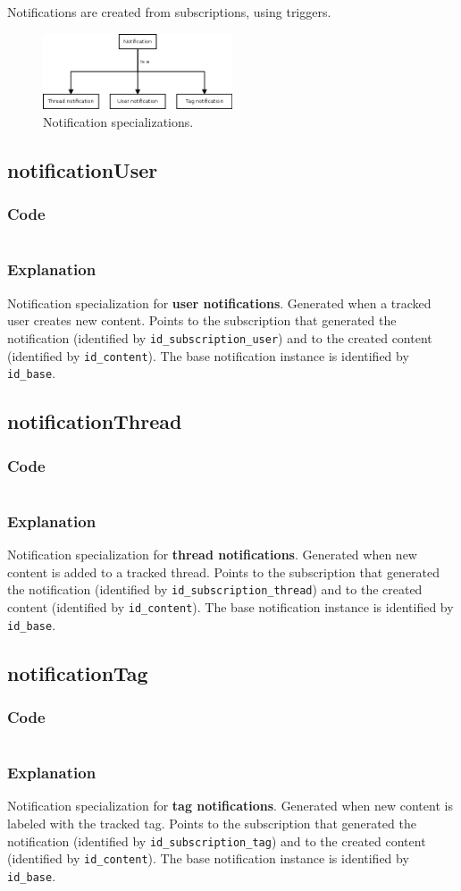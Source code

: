 \documentclass[12pt]{report}
\renewcommand\emph{\textbf}
\newcommand{\printSQLtest}[1]
{
    \inputminted[linenos, breaklines, breakbytoken, tabsize=4, fontsize=\footnotesize]{mysql}{#1}
}
\newcommand{\printSQLTablepage}[2]
{    
    \subsection{#2}
    \subsubsection{Code}
    \printSQLtest{../sql/parts/#1}
    \subsubsection{Explanation}
}
\begin{document}
                    Notifications are created from subscriptions, using triggers.

                    \begin{figure}[!htb]
                    \caption{Notification specializations.}
                    \centering
                    \includegraphics[width=0.5\textwidth]{td/15notificationbase}
                    \end{figure}

                \newpage

                \printSQLTablepage{16_tblNotificationUser.sql}{notificationUser}
                    Notification specialization for \emph{user notifications}. Generated when a tracked user creates new content. Points to the subscription that generated the notification (identified by \texttt{id_subscription_user}) and to the created content (identified by \texttt{id_content}).
                    The base notification instance is identified by \texttt{id_base}.

                \newpage    

                \printSQLTablepage{17_tblNotificationThread.sql}{notificationThread}
                    Notification specialization for \emph{thread notifications}. Generated when new content is added to a tracked thread. Points to the subscription that generated the notification (identified by \texttt{id_subscription_thread}) and to the created content (identified by \texttt{id_content}).
                    The base notification instance is identified by \texttt{id_base}.

                \newpage

                \printSQLTablepage{18_tblNotificationTag.sql}{notificationTag}
                    Notification specialization for \emph{tag notifications}. Generated when new content is labeled with the tracked tag. Points to the subscription that generated the notification (identified by \texttt{id_subscription_tag}) and to the created content (identified by \texttt{id_content}).
                    The base notification instance is identified by \texttt{id_base}.
\end{document}
